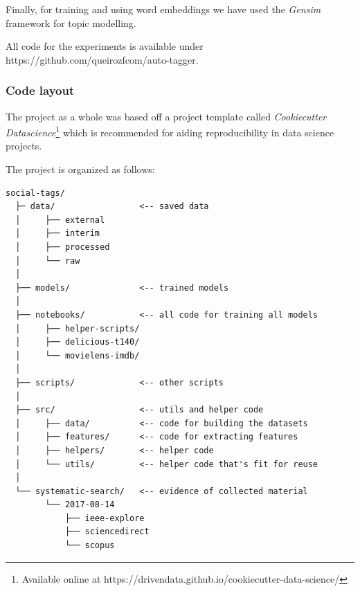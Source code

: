 Finally, for training and using word embeddings we have used the \textit{Gensim} framework for topic modelling.

All code for the experiments is available under https://github.com/queirozfcom/auto-tagger.

\subsubsection{Code layout}

The project as a whole was based off a project template called \textit{Cookiecutter Datascience}\footnote{Available online at https://drivendata.github.io/cookiecutter-data-science/} which is recommended for aiding reproducibility in data science projects.

The project is organized as follows:
\begin{frame}

\begin{lstlisting}[style=tree]
social-tags/
  ├─ data/                 <-- saved data
  │     ├── external
  │     ├── interim
  │     ├── processed
  │     └── raw
  │
  ├── models/              <-- trained models 
  │
  ├── notebooks/           <-- all code for training all models
  │     ├── helper-scripts/
  │     ├── delicious-t140/
  │     └── movielens-imdb/
  │
  ├── scripts/             <-- other scripts
  │
  ├── src/                 <-- utils and helper code
  │     ├── data/          <-- code for building the datasets      
  │     ├── features/      <-- code for extracting features
  │     ├── helpers/       <-- helper code
  │     └── utils/         <-- helper code that's fit for reuse
  │
  └── systematic-search/   <-- evidence of collected material
        └── 2017-08-14
            ├── ieee-explore
            ├── sciencedirect
            └── scopus
\end{lstlisting}

\end{frame}  